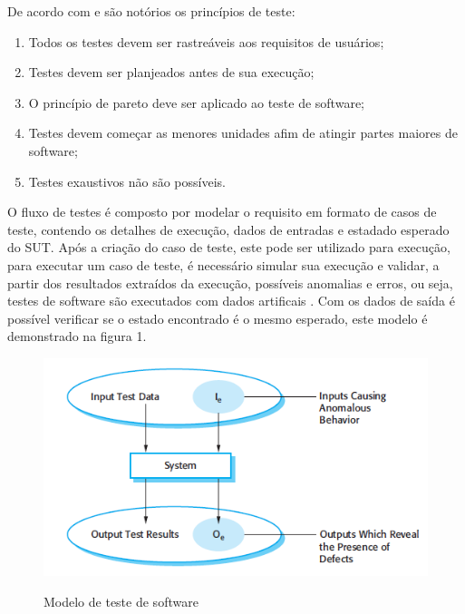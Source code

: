 \documentclass[
	12pt,				%
	oneside,			%
	a4paper,			%
	english,			%
	brazil				%
	]{abntex2ppgsi}
\begin{document}
De acordo com \cite{pressman2009engenharia} e \cite{Davis1995} são notórios os princípios de teste: 

\begin{enumerate}
\item Todos os testes devem ser rastreáveis aos requisitos de usuários;
\item Testes devem ser planjeados antes de sua execução;
\item O princípio de pareto deve ser aplicado ao teste de software;
\item Testes devem começar as menores unidades afim de atingir partes maiores de software;
\item Testes exaustivos não são possíveis.
\end{enumerate}


O fluxo de testes  é composto por modelar o requisito em formato de casos de teste,
contendo os detalhes de execução, dados de entradas e estadado esperado do SUT. Após a criação do caso de teste, este pode ser utilizado para execução, para executar um caso de teste,  é necessário simular sua execução e validar, a partir dos resultados extraídos da execução, possíveis anomalias e erros, ou seja, testes de software são executados com dados artificais \cite{Sommerville2010}. Com os dados de saída  é possível verificar se o estado encontrado é o mesmo esperado, este modelo é demonstrado na figura 1.


\begin{figure}[H]%
	\centering
 	  \caption{Modelo de teste de software}
		\includegraphics{modelo-teste.png}
	\label{fig:tipos-custo-arvore}
\end{figure}
\end{document}
